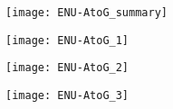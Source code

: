 \documentclass{article}
\begin{document}
\begin{figure}
    \centering
    
    \begin{subfigure}[b]{0.4\textwidth}
        \centering
        \texttt{[image: ENU-AtoG\_summary]}
        \caption{}
        \label{fig:c-t:summary}
    \end{subfigure}
    \hspace{1em}
    \begin{subfigure}[b]{0.28\textwidth}
        \centering
        \texttt{[image: ENU-AtoG\_1]}
        \caption{}
        \label{fig:c-t:1}
    \end{subfigure}
    \vfill
    \begin{subfigure}[b]{0.4\textwidth}
        \centering
        \texttt{[image: ENU-AtoG\_2]}
        \caption{}
        \label{fig:c-t:2}
    \end{subfigure}
    \hspace{1em}
    \begin{subfigure}[b]{0.46\textwidth}
        \centering
         \texttt{[image: ENU-AtoG\_3]}
        \caption{}
        \label{fig:c-t:3}
    \end{subfigure}
\end{figure}
\end{document}

